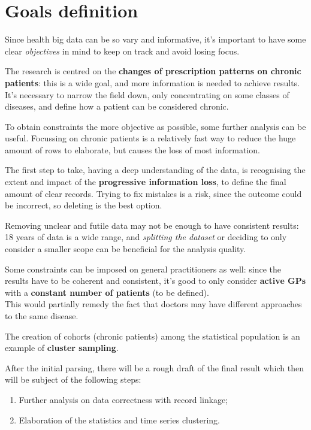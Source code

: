 \chapter{Goals definition}

Since health big data can be so vary and informative, it's important to have some clear \textit{objectives} in mind to keep on track and avoid losing focus. 

The research is centred on the \textbf{changes of prescription patterns on chronic patients}: this is a wide goal, and more information is needed to achieve results. It's necessary to narrow the field down, only concentrating on some classes of diseases, and define how a patient can be considered chronic. 

To obtain constraints the more objective as possible, some further analysis can be useful. Focussing on chronic patients is a relatively fast way to reduce the huge amount of rows to elaborate, but causes the loss of most information.

The first step to take, having a deep understanding of the data, is recognising the extent and impact of the \textbf{progressive information loss}, to define the final amount of clear records. Trying to fix mistakes is a risk, since the outcome could be incorrect, so deleting is the best option.

Removing unclear and futile data may not be enough to have consistent results: 18 years of data is a wide range, and \textit{splitting the dataset} or deciding to only consider a smaller scope can be beneficial for the analysis quality. 

Some constraints can be imposed on general practitioners as well: since the results have to be coherent and consistent, it's good to only consider \textbf{active GPs} with a \textbf{constant number of patients} (to be defined). \\ This would partially remedy the fact that doctors may have different approaches to the same disease.

The creation of cohorts (chronic patients) among the statistical population is an example of \textbf{cluster sampling}.

After the initial parsing, there will be a rough draft of the final result which then will be subject of the following steps:
\begin{enumerate}
	\item Further analysis on data correctness with record linkage;
	\item Elaboration of the statistics and time series clustering.
\end{enumerate}

